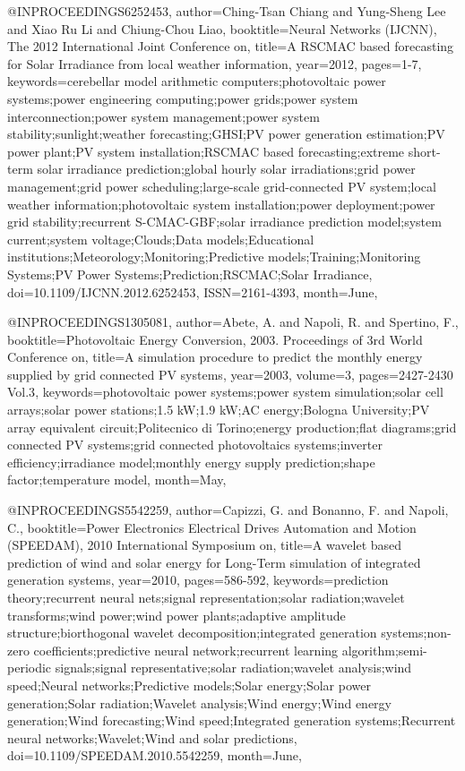 @INPROCEEDINGS{6252453, 
author={Ching-Tsan Chiang and Yung-Sheng Lee and Xiao Ru Li and Chiung-Chou Liao}, 
booktitle={Neural Networks (IJCNN), The 2012 International Joint Conference on}, 
title={A RSCMAC based forecasting for Solar Irradiance from local weather information}, 
year={2012}, 
pages={1-7}, 
keywords={cerebellar model arithmetic computers;photovoltaic power systems;power engineering computing;power grids;power system interconnection;power system management;power system stability;sunlight;weather forecasting;GHSI;PV power generation estimation;PV power plant;PV system installation;RSCMAC based forecasting;extreme short-term solar irradiance prediction;global hourly solar irradiations;grid power management;grid power scheduling;large-scale grid-connected PV system;local weather information;photovoltaic system installation;power deployment;power grid stability;recurrent S-CMAC-GBF;solar irradiance prediction model;system current;system voltage;Clouds;Data models;Educational institutions;Meteorology;Monitoring;Predictive models;Training;Monitoring Systems;PV Power Systems;Prediction;RSCMAC;Solar Irradiance}, 
doi={10.1109/IJCNN.2012.6252453}, 
ISSN={2161-4393}, 
month={June},}

@INPROCEEDINGS{1305081, 
author={Abete, A. and Napoli, R. and Spertino, F.}, 
booktitle={Photovoltaic Energy Conversion, 2003. Proceedings of 3rd World Conference on}, 
title={A simulation procedure to predict the monthly energy supplied by grid connected PV systems}, 
year={2003}, 
volume={3}, 
pages={2427-2430 Vol.3}, 
keywords={photovoltaic power systems;power system simulation;solar cell arrays;solar power stations;1.5 kW;1.9 kW;AC energy;Bologna University;PV array equivalent circuit;Politecnico di Torino;energy production;flat diagrams;grid connected PV systems;grid connected photovoltaics systems;inverter efficiency;irradiance model;monthly energy supply prediction;shape factor;temperature model}, 
month={May},}

@INPROCEEDINGS{5542259, 
author={Capizzi, G. and Bonanno, F. and Napoli, C.}, 
booktitle={Power Electronics Electrical Drives Automation and Motion (SPEEDAM), 2010 International Symposium on}, 
title={A wavelet based prediction of wind and solar energy for Long-Term simulation of integrated generation systems}, 
year={2010}, 
pages={586-592}, 
keywords={prediction theory;recurrent neural nets;signal representation;solar radiation;wavelet transforms;wind power;wind power plants;adaptive amplitude structure;biorthogonal wavelet decomposition;integrated generation systems;non-zero coefficients;predictive neural network;recurrent learning algorithm;semi-periodic signals;signal representative;solar radiation;wavelet analysis;wind speed;Neural networks;Predictive models;Solar energy;Solar power generation;Solar radiation;Wavelet analysis;Wind energy;Wind energy generation;Wind forecasting;Wind speed;Integrated generation systems;Recurrent neural networks;Wavelet;Wind and solar predictions}, 
doi={10.1109/SPEEDAM.2010.5542259}, 
month={June},}


